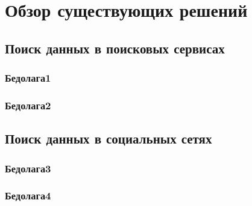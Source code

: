 \section{Обзор существующих решений}
\label{sec:Chapter2} 
\subsection{Поиск данных в поисковых сервисах}
\subsubsection{Бедолага1}
\subsubsection{Бедолага2}
\subsection{Поиск данных в социальных сетях}
\subsubsection{Бедолага3}
\subsubsection{Бедолага4}
